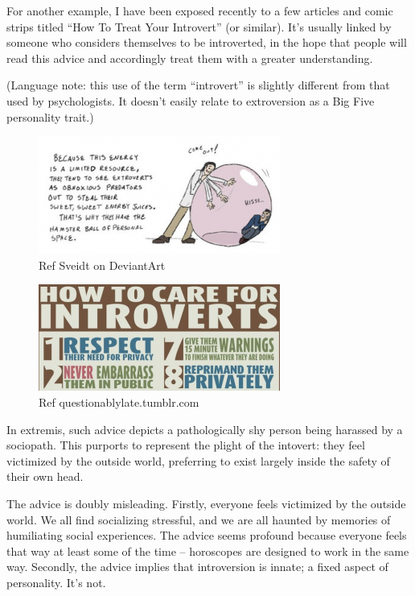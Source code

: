 For another example, I have been exposed recently to a few articles and comic strips titled ``How To Treat Your Introvert'' (or similar). It's usually linked by someone who considers themselves to be introverted, in the hope that people will read this advice and accordingly treat them with a greater understanding.

(Language note: this use of the term ``introvert'' is slightly different from that used by psychologists. It doesn't easily relate to extroversion as a Big Five personality trait.)

\begin{figure}
  \begin{center}
    \includegraphics{content/assets/fursonas-happier--bubble}
  \end{center}
  \caption{Ref Sveidt on DeviantArt}
\end{figure}

\begin{figure}
  \begin{center}
    \includegraphics{content/assets/fursonas-happier--introverts}
  \end{center}
  \caption{Ref questionablylate.tumblr.com}
\end{figure}

In extremis, such advice depicts a pathologically shy person being harassed by a sociopath. This purports to represent the plight of the intovert: they feel victimized by the outside world, preferring to exist largely inside the safety of their own head.

The advice is doubly misleading. Firstly, everyone feels victimized by the outside world. We all find socializing stressful, and we are all haunted by memories of humiliating social experiences. The advice seems profound because everyone feels that way at least some of the time -- horoscopes are designed to work in the same way. Secondly, the advice implies that introversion is innate; a fixed aspect of personality. It's not.

